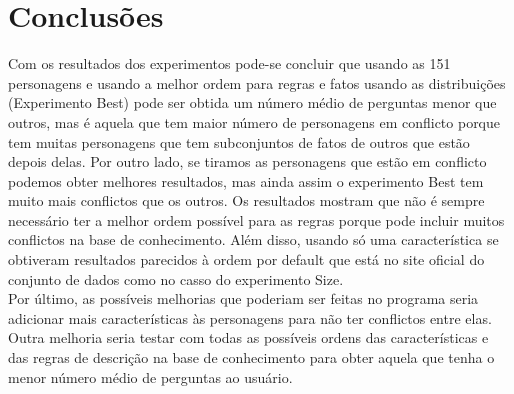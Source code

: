 \section{Conclusões}
	Com os resultados dos experimentos pode-se concluir que usando as 151 personagens e usando a melhor ordem para regras e fatos usando as distribuições (Experimento Best) pode ser obtida um número médio de perguntas menor que outros, mas é aquela que tem maior número de personagens em conflicto porque tem muitas personagens que tem subconjuntos de fatos de outros que estão depois delas. Por outro lado, se tiramos as personagens que estão em conflicto podemos obter melhores resultados, mas ainda assim o experimento Best tem muito mais conflictos que os outros. Os resultados mostram que não é sempre necessário ter a melhor ordem possível para as regras porque pode incluir muitos conflictos na base de conhecimento. Além disso, usando só uma característica se obtiveram resultados parecidos à ordem por default que está no site oficial do conjunto de dados como no casso do experimento Size.\\
	Por último, as possíveis melhorias que poderiam ser feitas no programa seria adicionar mais características às personagens para não ter conflictos entre elas. Outra melhoria seria testar com todas as possíveis ordens das características e das regras de descrição na base de conhecimento para obter aquela que tenha o menor número médio de perguntas ao usuário.